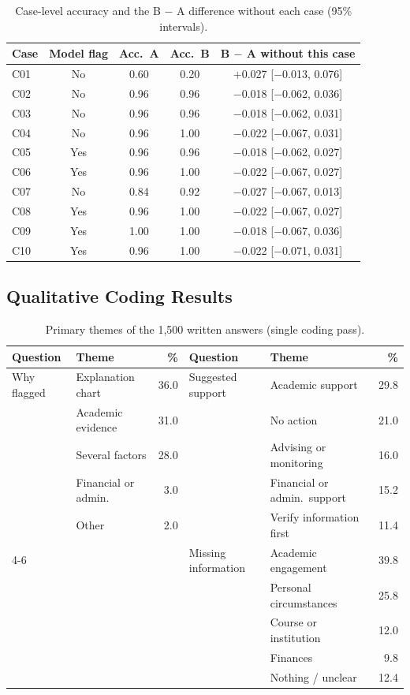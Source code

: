 \begin{table}[H]
\centering
\caption{Case-level accuracy and the B $-$ A difference without each case (95\% intervals).}
\label{tab:cases}
\footnotesize
\begin{tabular}{@{}lcccc@{}}
\toprule
\textbf{Case} & \textbf{Model flag} & \textbf{Acc.\ A} & \textbf{Acc.\ B} & \textbf{B $-$ A without this case} \\
\midrule
C01 & No  & 0.60 & 0.20 & $+$0.027 [$-$0.013, 0.076] \\
C02 & No  & 0.96 & 0.96 & $-$0.018 [$-$0.062, 0.036] \\
C03 & No  & 0.96 & 0.96 & $-$0.018 [$-$0.062, 0.031] \\
C04 & No  & 0.96 & 1.00 & $-$0.022 [$-$0.067, 0.031] \\
C05 & Yes & 0.96 & 0.96 & $-$0.018 [$-$0.062, 0.027] \\
C06 & Yes & 0.96 & 1.00 & $-$0.022 [$-$0.067, 0.027] \\
C07 & No  & 0.84 & 0.92 & $-$0.027 [$-$0.067, 0.013] \\
C08 & Yes & 0.96 & 1.00 & $-$0.022 [$-$0.067, 0.027] \\
C09 & Yes & 1.00 & 1.00 & $-$0.018 [$-$0.067, 0.036] \\
C10 & Yes & 0.96 & 1.00 & $-$0.022 [$-$0.071, 0.031] \\
\bottomrule
\end{tabular}
\end{table}

\subsection{Qualitative Coding Results}

\begin{table}[H]
\centering
\caption{Primary themes of the 1,500 written answers (single coding pass).}
\label{tab:themes}
\footnotesize
\begin{tabular}{@{}llr@{\hspace{24pt}}llr@{}}
\toprule
\textbf{Question} & \textbf{Theme} & \textbf{\%} & \textbf{Question} & \textbf{Theme} & \textbf{\%} \\
\midrule
Why flagged & Explanation chart & 36.0 & Suggested support & Academic support & 29.8 \\
 & Academic evidence & 31.0 & & No action & 21.0 \\
 & Several factors & 28.0 & & Advising or monitoring & 16.0 \\
 & Financial or admin. & 3.0 & & Financial or admin.\ support & 15.2 \\
 & Other & 2.0 & & Verify information first & 11.4 \\
\cmidrule{4-6}
 & & & Missing information & Academic engagement & 39.8 \\
 & & & & Personal circumstances & 25.8 \\
 & & & & Course or institution & 12.0 \\
 & & & & Finances & 9.8 \\
 & & & & Nothing / unclear & 12.4 \\
\bottomrule
\end{tabular}
\end{table}

